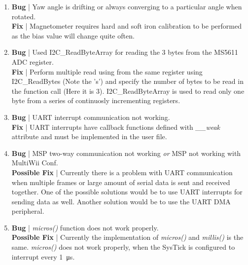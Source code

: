 \documentclass[a4paper,12pt,oneside]{book}
\begin{document}
\begin{enumerate}
\item \textbf{Bug} | Yaw angle is drifting or always converging to a particular angle when rotated.\\
\textbf{Fix} | Magnetometer requires hard and soft iron calibration to be performed as the bias value will change quite often.\\

\item \textbf{Bug} | Used I2C{\_}ReadByteArray for reading the 3 bytes from the MS5611 ADC register.\\
\textbf{Fix} | Perform multiple read using from the same register using I2C{\_}ReadBytes (Note the 's') and specify the number of bytes to be read in the function call (Here it is 3). I2C{\_}ReadByteArray is used to read only one byte from a series of continuosly incrementing registers.\\

\item \textbf{Bug} | UART interrupt communication not working.\\
\textbf{Fix} | UART interrupts have callback functions defined with \textit{{\_\_}weak} attribute and must be implemented in the user file.\\

\item \textbf{Bug} | MSP two-way communication not working \textit{or} MSP not working with MultiWii Conf.\\
\textbf{Possible Fix} | Currently there is a problem with UART communication when multiple frames or large amount of serial data is sent and received together. One of the possible solutions would be to use UART interrupts for sending data as well. Another solution would be to use the UART DMA peripheral.\\

\item \textbf{Bug} | \textit{micros()} function does not work properly.\\
\textbf{Possible Fix} | Currently the implementation of \textit{micros()} and \textit{millis()} is the same. \textit{micros()} does not work properly, when the SysTick is configured to interrupt every \SI{1}{\micro\second}.\\

\end{enumerate}

\end{document}
